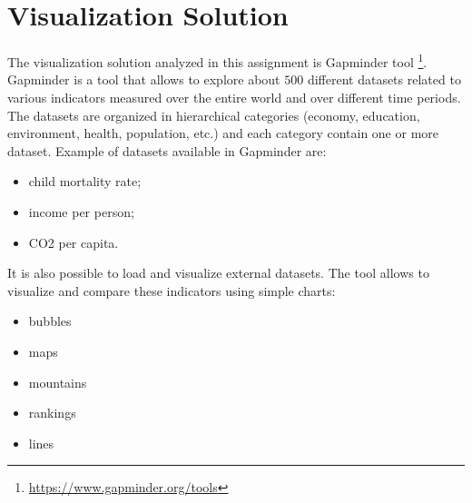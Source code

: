\section{Visualization Solution}
\label{sec:visualization_solution}

The visualization solution analyzed in this assignment is Gapminder tool \footnote{\url{https://www.gapminder.org/tools}}.
Gapminder is a tool that allows to explore about $500$ different datasets related to various indicators measured over the entire world and over different time periods.
The datasets are organized in hierarchical categories (economy, education, environment, health, population, etc.) and each category contain one or more dataset.
Example of datasets available in Gapminder are:
\begin{itemize}
    \item child mortality rate;
    \item income per person;
    \item CO2 per capita.
\end{itemize}
It is also possible to load and visualize external datasets.
The tool allows to visualize and compare these indicators using simple charts:
\begin{itemize}
    \item bubbles
    \item maps
    \item mountains
    \item rankings
    \item lines
\end{itemize}

